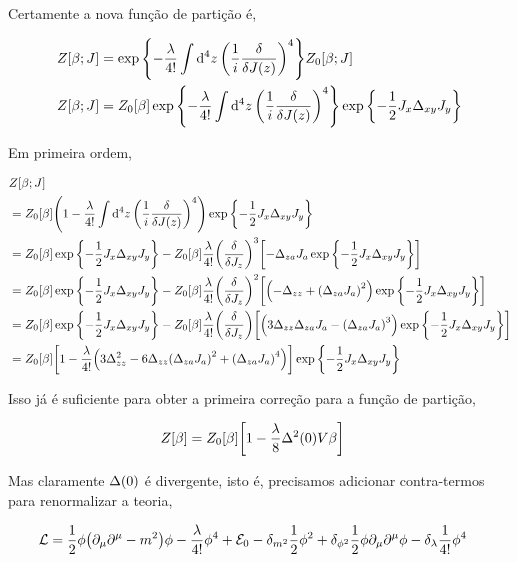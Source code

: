 \documentclass[twoside]{amsart}
\numberwithin{equation}{section}
\begin{document}
Certamente a nova função de partição é,

\begin{align}
    Z\qty[\beta; J]&=\exp\qty{-\frac{\lambda}{4!}\int\dd[4]{z}\qty(\frac{1}{i}\fdv{}{J\qty(z)})^4}Z_0[\beta;J]\\
    Z\qty[\beta; J]&=Z_0[\beta]\exp\qty{-\frac{\lambda}{4!}\int\dd[4]{z}\qty(\frac{1}{i}\fdv{}{J\qty(z)})^4}\exp\qty{-\frac12J_x\Delta_{xy}J_y}
\end{align}

Em primeira ordem,

\begin{align}
    &Z\qty[\beta; J]\\
    &=Z_0[\beta]\qty(1-\frac{\lambda}{4!}\int\dd[4]{z}\qty(\frac{1}{i}\fdv{}{J\qty(z)})^4)\exp\qty{-\frac12J_x\Delta_{xy}J_y}\\
    &=Z_0[\beta]\exp\qty{-\frac12J_x\Delta_{xy}J_y}-Z_0[\beta]\frac{\lambda}{4!}\qty(\fdv{}{J_z})^3\qty[-\Delta_{za}J_a\exp\qty{-\frac12J_x\Delta_{xy}J_y}]\\
    &=Z_0[\beta]\exp\qty{-\frac12J_x\Delta_{xy}J_y}-Z_0[\beta]\frac{\lambda}{4!}\qty(\fdv{}{J_z})^2\qty[\qty(-\Delta_{zz}+\qty(\Delta_{za}J_a)^2)\exp\qty{-\frac12J_x\Delta_{xy}J_y}]\\
    &=Z_0[\beta]\exp\qty{-\frac12J_x\Delta_{xy}J_y}-Z_0[\beta]\frac{\lambda}{4!}\qty(\fdv{}{J_z})\qty[\qty(3\Delta_{zz}\Delta_{za}J_a-\qty(\Delta_{za}J_a)^3)\exp\qty{-\frac12J_x\Delta_{xy}J_y}]\\
    &=Z_0[\beta]\qty[1-\frac{\lambda}{4!}\qty(3\Delta^2_{zz}-6\Delta_{zz}\qty(\Delta_{za}J_a)^2+\qty(\Delta_{za}J_a)^4)]\exp\qty{-\frac12J_x\Delta_{xy}J_y}
\end{align}

Isso já é suficiente para obter a primeira correção para a função de partição,

\begin{align}
    Z\qty[\beta]&=Z_0[\beta]\qty[1-\frac{\lambda}{8}\Delta^2\qty(0)V\beta]
\end{align}

Mas claramente $\Delta\qty(0)$ é divergente, isto é, precisamos adicionar contra-termos para renormalizar a teoria,

\begin{align}
    \mathcal L&=\frac12\phi\qty(\partial_\mu\partial^\mu-m^2)\phi-\frac{\lambda}{4!}\phi^4+\mathcal E_0-\delta_{m^2}\frac12\phi^2+\delta_{\phi^2}\frac12\phi\partial_\mu\partial^\mu\phi-\delta_{\lambda}\frac{1}{4!}\phi^4
\end{align}
\end{document}
